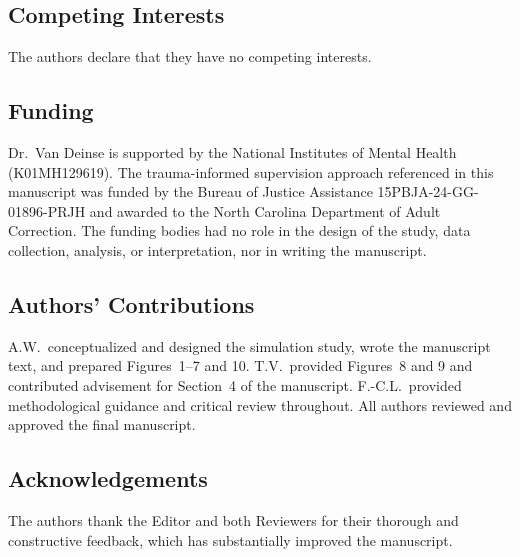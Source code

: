 \documentclass{article}[11pt]
\begin{document}
\subsection*{Competing Interests}
The authors declare that they have no competing interests.

\subsection*{Funding}
Dr.\ Van Deinse is supported by the National Institutes of Mental Health (K01MH129619). The trauma-informed supervision approach referenced in this manuscript was funded by the Bureau of Justice Assistance 15PBJA-24-GG-01896-PRJH and awarded to the North Carolina Department of Adult Correction. The funding bodies had no role in the design of the study, data collection, analysis, or interpretation, nor in writing the manuscript.

\subsection*{Authors' Contributions}
A.W.\ conceptualized and designed the simulation study, wrote the manuscript text, and prepared Figures~1--7 and 10. T.V.\ provided Figures~8 and 9 and contributed advisement for Section~4 of the manuscript. F.-C.L.\ provided methodological guidance and critical review throughout. All authors reviewed and approved the final manuscript.

\subsection*{Acknowledgements}
The authors thank the Editor and both Reviewers for their thorough and constructive feedback, which has substantially improved the manuscript.





\clearpage
\appendix
\renewcommand{\thesection}{\Alph{section}}
\end{document}
